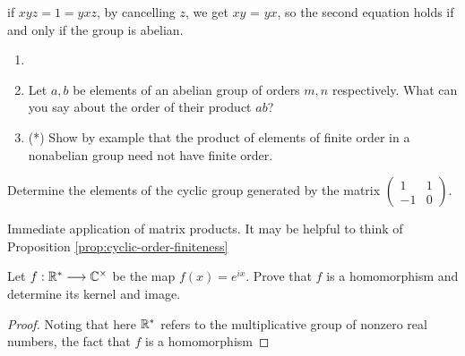 if $xyz = 1 = yxz$, by cancelling $z$, we get $xy$ = $yx$, so the second equation holds if and only if the group is abelian. 

\begin{boxedProblem}[2.2.20]
    \begin{enumerate}
        \item[]
    \item Let $a, b$ be elements of an abelian group of orders $m, n$ respectively. What can you say about the order of their product $ab$?
    \item (*) Show by example that the product of elements of finite order in a nonabelian group need not have finite order.
    \end{enumerate}
\end{boxedProblem}

\begin{boxedProblem}[2.2.1]
    Determine the elements of the cyclic group generated by the matrix $\begin{pmatrix} 1 & 1 \\ -1 & 0 \end{pmatrix}$.
\end{boxedProblem}
Immediate application of matrix products. It may be helpful to think of Proposition \ref{prop:cyclic-order-finiteness}

\begin{boxedProblem}[2.4.6] \label{exo:exponential-morphism}
    Let $f:\mathbb{R}^* \longrightarrow \mathbb{C}^\times$ be the map $f(x) = e^{ix}$. Prove that $f$ is a homomorphism and determine its kernel and image.
\end{boxedProblem}
\begin{proof}
    Noting that here $\mathbb{R}^*$ refers to the multiplicative group of nonzero real numbers, the fact that $f$ is a homomorphism
\end{proof}


